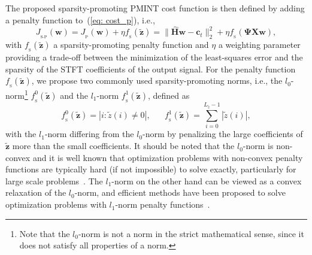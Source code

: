 \documentclass{article}
\begin{document}
The proposed sparsity-promoting PMINT cost function is then defined by adding a penalty function to~(\ref{eq: cost_p}), i.e.,
\begin{equation}
\label{eq: cost_sp}
J_{_{\text{S-P}}}(\mathbf{w}) = J_{_{\text{P}}}(\mathbf{w}) + \eta f_{_{\text{S}}}(\tilde{\mathbf{z}}) = \|\hat{\mathbf{H}}\mathbf{w}-\mathbf{c}_t \|_2^2 + \eta f_{_{\text{S}}}(\boldsymbol{\Psi}\mathbf{X}\mathbf{w}),
\end{equation}
with $f_{_{\text{S}}}(\tilde{\mathbf{z}})$ a sparsity-promoting penalty function and $\eta$ a weighting parameter providing a trade-off between the minimization of the least-squares error and the sparsity of the STFT coefficients of the output signal.
For the penalty function $f_{_{\text{S}}}(\tilde{\mathbf{z}})$, we propose two commonly used sparsity-promoting norms, i.e., the $l_0$-norm\footnote{Note that the $l_0$-norm is not a norm in the strict mathematical sense, since it does not satisfy all properties of a norm.} $f_{_{\text{S}}}^0(\tilde{\mathbf{z}})$ and the $l_1$-norm $f_{_{\text{S}}}^1(\tilde{\mathbf{z}})$, defined as
\begin{equation}
\label{eq: l0_norm}
f_{_{\text{S}}}^0(\tilde{\mathbf{z}}) = |i: \tilde{z}(i) \neq 0 |,  \; \; \;  \; \; \; f_{_{\text{S}}}^1(\tilde{\mathbf{z}}) = \sum_{i=0}^{L_{\tilde{z}}-1}|\tilde{z}(i)|,
\end{equation}
with the $l_1$-norm differing from the $l_0$-norm by penalizing the large coefficients of $\tilde{\mathbf{z}}$ more than the small coefficients. 
It should be noted that the $l_0$-norm is non-convex and it is well known that optimization problems with non-convex penalty functions are typically hard (if not impossible) to solve exactly, particularly for large scale problems~\cite{Natarajan_SIAM_1995}. 
The $l_1$-norm on the other hand can be viewed as a convex relaxation of the $l_0$-norm, and efficient methods have been proposed to solve optimization problems with $l_1$-norm penalty functions~\cite{Boyd_book,Chartrand_ICASSP_2014}. 
\end{document}
